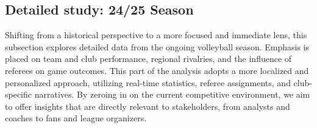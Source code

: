 \subsection{Detailed study: 24/25 Season}
\label{sub:short-range}


Shifting from a historical perspective to a more focused and immediate lens, this subsection explores detailed data from the ongoing volleyball season. Emphasis is placed on team and club performance, regional rivalries, and the influence of referees on game outcomes. This part of the analysis adopts a more localized and personalized approach, utilizing real-time statistics, referee assignments, and club-specific narratives. By zeroing in on the current competitive environment, we aim to offer insights that are directly relevant to stakeholders, from analysts and coaches to fans and league organizers.

